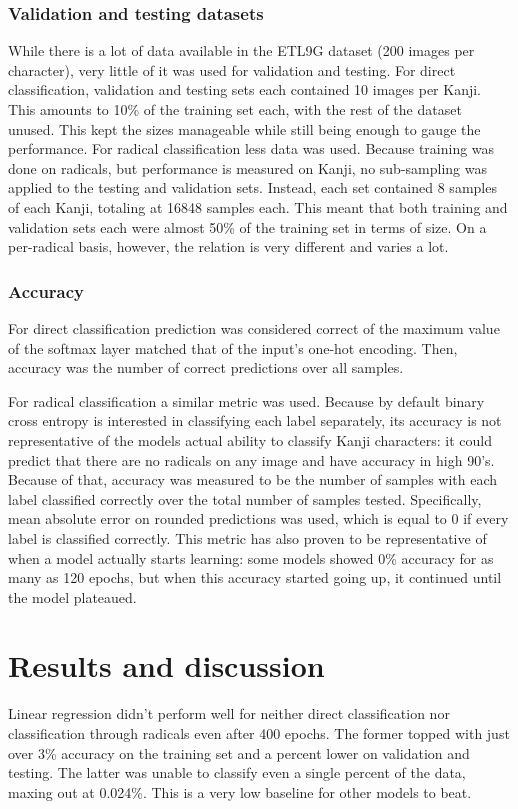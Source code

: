 \documentclass{article}
\begin{document}
\begin{CJK*}{UTF8}{min}
\subsubsection{Validation and testing datasets}
While there is a lot of data available in the ETL9G dataset (200 images per character), very little of it was used for validation and testing. For direct classification, validation and testing sets each contained 10 images per Kanji. This amounts to 10\% of the training set each, with the rest of the dataset unused. This kept the sizes manageable while still being enough to gauge the performance. For radical classification less data was used. Because training was done on radicals, but performance is measured on Kanji, no sub-sampling was applied to the testing and validation sets. Instead, each set contained 8 samples of each Kanji, totaling at 16848 samples each. This meant that both training and validation sets each were almost 50\% of the training set in terms of size. On a per-radical basis, however, the relation is very different and varies a lot.

\subsubsection{Accuracy}
For direct classification prediction was considered correct of the maximum value of the softmax layer matched that of the input's one-hot encoding. Then, accuracy was the number of correct predictions over all samples.

For radical classification a similar metric was used. Because by default binary cross entropy is interested in classifying each label separately, its accuracy is not representative of the models actual ability to classify Kanji characters: it could predict that there are no radicals on any image and have accuracy in high 90's. Because of that, accuracy was measured to be the number of samples with each label classified correctly over the total number of samples tested. Specifically, mean absolute error on rounded predictions was used, which is equal to 0 if every label is classified correctly. This metric has also proven to be representative of when a model actually starts learning: some models showed 0\% accuracy for as many as 120 epochs, but when this accuracy started going up, it continued until the model plateaued.

\section{Results and discussion}
Linear regression didn't perform well for neither direct classification nor classification through radicals even after 400 epochs. The former topped with just over 3\% accuracy on the training set and a percent lower on validation and testing. The latter was unable to classify even a single percent of the data, maxing out at 0.024\%. This is a very low baseline for other models to beat.


\end{CJK*}
\end{document}

